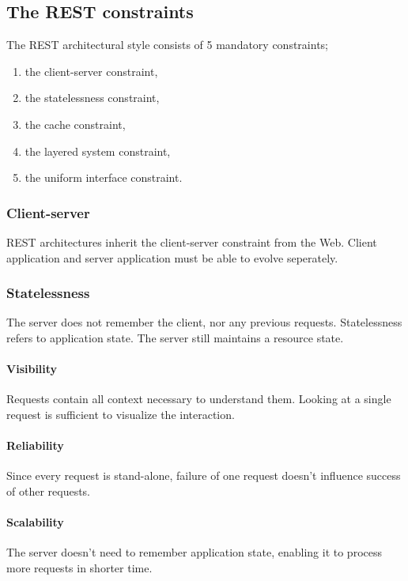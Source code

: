 \documentclass{report}
\begin{document}
\subsection{The REST constraints}

The REST architectural style consists of 5 mandatory constraints;
\begin{enumerate}
  \item the client-server constraint,
  \item the statelessness constraint,
  \item the cache constraint,
  \item the layered system constraint,
  \item the uniform interface constraint.
\end{enumerate}

\subsubsection{Client-server}

REST architectures inherit
the client-server constraint from the Web.
Client application and server application
must be able to evolve seperately.

\subsubsection{Statelessness}

The server does not remember the client,
nor any previous requests.
Statelessness refers to application state.
The server still maintains a resource state.

\paragraph{Visibility} Requests
contain all context necessary to understand them.
Looking at a single request is
sufficient to visualize the interaction.

\paragraph{Reliability} Since every request is stand-alone,
failure of one request
doesn't influence success of other requests.

\paragraph{Scalability} The server
doesn't need to remember application state,
enabling it to process more requests in shorter time.
\end{document}
